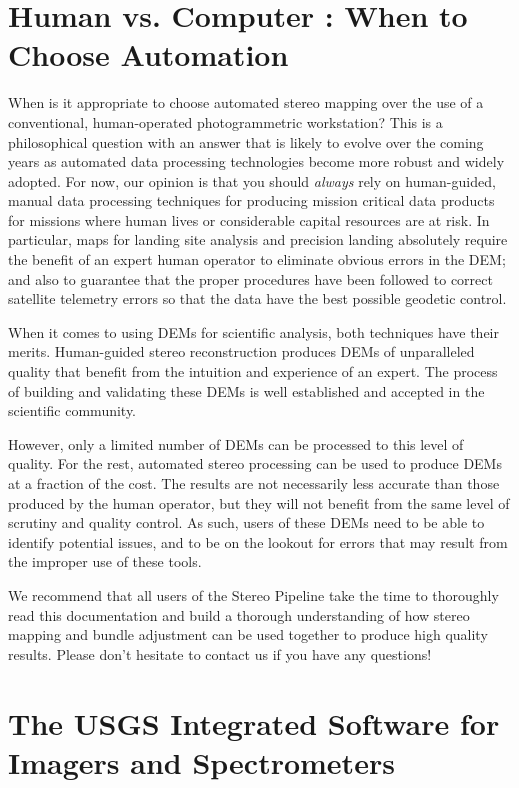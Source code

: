 \section{Human vs. Computer : When to Choose Automation}

When is it appropriate to choose automated stereo mapping over the use
of a conventional, human-operated photogrammetric workstation?  This
is a philosophical question with an answer that is likely to evolve
over the coming years as automated data processing technologies become
more robust and widely adopted.  For now, our opinion is that you
should {\em always} rely on human-guided, manual data processing
techniques for producing mission critical data products for missions
where human lives or considerable capital resources are at risk.  In
particular, maps for landing site analysis and precision landing
absolutely require the benefit of an expert human operator to
eliminate obvious errors in the DEM; and also to guarantee that the
proper procedures have been followed to correct satellite telemetry
errors so that the data have the best possible geodetic control.

When it comes to using DEMs for scientific analysis, both techniques
have their merits.  Human-guided stereo reconstruction produces DEMs
of unparalleled quality that benefit from the intuition and experience
of an expert.  The process of building and validating these DEMs is
well established and accepted in the scientific community. 

However, only a limited number of DEMs can be processed to this level
of quality.  For the rest, automated stereo processing can be used to
produce DEMs at a fraction of the cost.  The results are not
necessarily less accurate than those produced by the human operator,
but they will not benefit from the same level of scrutiny and quality
control.  As such, users of these DEMs need to be able to identify
potential issues, and to be on the lookout for errors that may result
from the improper use of these tools.  

We recommend that all users of the Stereo Pipeline take the time to
thoroughly read this documentation and build a thorough understanding
of how stereo mapping and bundle adjustment can be used together to
produce high quality results.  Please don't hesitate to contact us if
you have any questions!

\section{The USGS Integrated Software for Imagers and Spectrometers}


